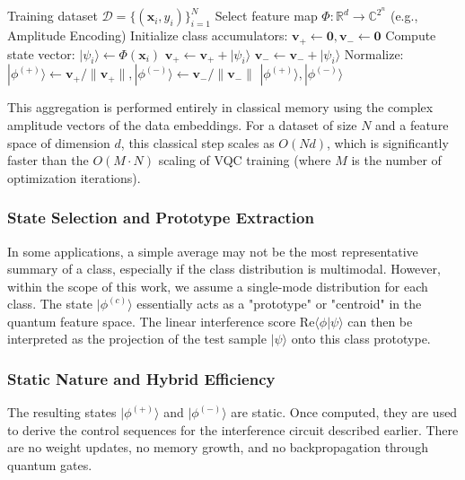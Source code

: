 \documentclass[conference]{IEEEtran}
\begin{document}
\begin{algorithm}[ht]
\caption{Static Learning of Class-Representative States}
\label{alg:learning}
\begin{algorithmic}[1]
\REQUIRE Training dataset $\mathcal{D} = \{(\mathbf{x}_i, y_i)\}_{i=1}^N$
\STATE Select feature map $\Phi: \mathbb{R}^d \rightarrow \mathbb{C}^{2^n}$ (e.g., Amplitude Encoding)
\STATE Initialize class accumulators: $\mathbf{v}_+ \leftarrow \mathbf{0}, \mathbf{v}_- \leftarrow \mathbf{0}$
    \STATE Compute state vector: $|\psi_i\rangle \leftarrow \Phi(\mathbf{x}_i)$
        \STATE $\mathbf{v}_+ \leftarrow \mathbf{v}_+ + |\psi_i\rangle$
    \ELSE
        \STATE $\mathbf{v}_- \leftarrow \mathbf{v}_- + |\psi_i\rangle$
    \ENDIF
\ENDFOR
\STATE Normalize: $|\phi^{(+)}\rangle \leftarrow \mathbf{v}_+/\|\mathbf{v}_+\|, |\phi^{(-)}\rangle \leftarrow \mathbf{v}_-/\|\mathbf{v}_-\|$
\RETURN $|\phi^{(+)}\rangle, |\phi^{(-)}\rangle$
\end{algorithmic}
\end{algorithm}

This aggregation is performed entirely in classical memory using the complex amplitude vectors of the data embeddings. For a dataset of size $N$ and a feature space of dimension $d$, this classical step scales as $O(Nd)$, which is significantly faster than the $O(M \cdot N)$ scaling of VQC training (where $M$ is the number of optimization iterations).

\subsubsection{State Selection and Prototype Extraction}
In some applications, a simple average may not be the most representative summary of a class, especially if the class distribution is multimodal. However, within the scope of this work, we assume a single-mode distribution for each class. The state $|\phi^{(c)}\rangle$ essentially acts as a "prototype" or "centroid" in the quantum feature space. The linear interference score $\text{Re}\langle \phi | \psi \rangle$ can then be interpreted as the projection of the test sample $|\psi\rangle$ onto this class prototype.

\subsubsection{Static Nature and Hybrid Efficiency}
The resulting states $|\phi^{(+)}\rangle$ and $|\phi^{(-)}\rangle$ are static. Once computed, they are used to derive the control sequences for the interference circuit described earlier. There are no weight updates, no memory growth, and no backpropagation through quantum gates.
\end{document}
